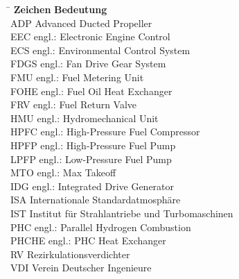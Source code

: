 \begin{tabbing}
	\hspace*{3cm} \= \hspace*{8cm} \kill
	\textbf{Zeichen} \> \textbf{Bedeutung} 							\\[5mm]
    ADP     \>  Advanced Ducted Propeller                           \\
    EEC     \>  engl.: Electronic Engine Control                    \\
    ECS     \>  engl.: Environmental Control System                 \\
    FDGS    \>  engl.: Fan Drive Gear System                        \\
    FMU     \>  engl.: Fuel Metering Unit                           \\
    FOHE    \>  engl.: Fuel Oil Heat Exchanger                      \\
    FRV     \>  engl.: Fuel Return Valve                            \\
    HMU     \>  engl.: Hydromechanical Unit                         \\
    HPFC    \>  engl.: High-Pressure Fuel Compressor                \\
    HPFP    \>  engl.: High-Pressure Fuel Pump                      \\
    LPFP    \>  engl.: Low-Pressure Fuel Pump                       \\
    MTO     \>  engl.: Max Takeoff                                  \\
    IDG     \>  engl.: Integrated Drive Generator                   \\
    ISA     \>  Internationale Standardatmosphäre                   \\
	IST		\> 	Institut für Strahlantriebe und Turbomaschinen		\\
    PHC     \>  engl.: Parallel Hydrogen Combustion                 \\
    PHCHE   \>  engl.: PHC Heat Exchanger                           \\
    RV      \>  Rezirkulationsverdichter                            \\
	VDI		\>	Verein Deutscher Ingenieure							\\

\end{tabbing}